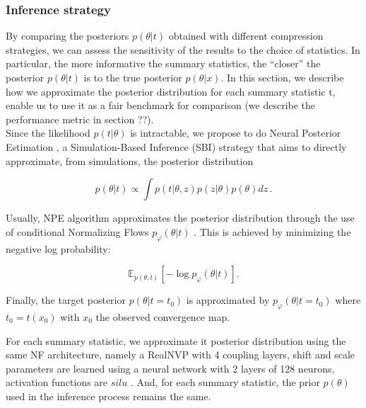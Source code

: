 \documentclass{aa}
\begin{document}

\subsubsection{Inference strategy}
By comparing the posteriors $p(\theta| t)$ obtained with different compression strategies, we can assess the sensitivity of the results to the choice of statistics. In particular, the more informative the summary statistics, the “closer” the posterior $p(\theta | t)$ is to the true posterior $p(\theta | x)$. In this section, we describe how we approximate the posterior distribution for each summary statistic t, enable us to use it as a fair benchmark for comparison (we describe the performance metric in section ??).\\
Since the likelihood $p(t|\theta)$ is intractable, we propose to do Neural Posterior Estimation \citep{npe1, npe2, npe3}, a Simulation-Based Inference (SBI) strategy that aims to directly approximate, from simulations, the posterior distribution 

\begin{equation}
    p(\theta | t) \propto \int p(t | \theta, z) p(z|\theta) p(\theta) dz\,.
\end{equation}

Usually, NPE algorithm approximates the posterior distribution through the use of conditional Normalizing Flows $p_{\varphi} (\theta | t)$ \citep{nf1, nf2}. This is achieved by minimizing the negative log probability: 

\begin{equation}
    \mathbb{E}_{p(\theta, t)} \left[ - \log p_{\varphi} (\theta | t)  \right].
    \label{eq:nll}
\end{equation}

Finally, the target posterior $p(\theta | t = t_0)$ is approximated by $p_{\varphi}(\theta | t = t_0)$ where $t_0 = t(x_0)$ with $x_0$ the observed convergence map.

For each summary statistic, we approximate it posterior distribution using the same NF architecture, namely a RealNVP \citep{realnvp} with 4 coupling layers, shift and scale parameters are learned using a neural network with 2 layers of 128 neurons, activation functions are $silu$ \citep{silu}. And, for each summary statistic, the prior $p(\theta)$ used in the inference process remains the same.
\end{document}
